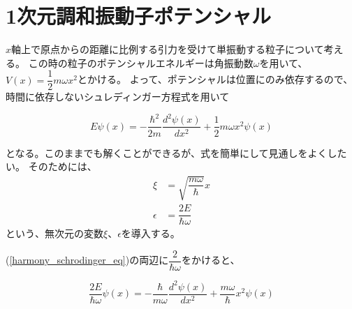 
\section{1次元調和振動子ポテンシャル}
$x$軸上で原点からの距離に比例する引力を受けて単振動する粒子について考える。
この時の粒子のポテンシャルエネルギーは角振動数$\omega$を用いて、$V(x) = \dfrac{1}{2}m\omega x^2$とかける。
よって、ポテンシャルは位置にのみ依存するので、時間に依存しないシュレディンガー方程式を用いて

\begin{equation}
  \label{harmony_schrodinger_eq}
  E\psi(x) = - \dfrac{\hbar^2}{2m} \dfrac{d^2 \psi(x)}{d x^2} + \dfrac{1}{2}m\omega x^2\psi(x)
\end{equation}

となる。このままでも解くことができるが、式を簡単にして見通しをよくしたい。
そのためには、
\begin{align}
  \label{xi}
  \xi &= \sqrt{\dfrac{m\omega}{\hbar}}x \\
  \label{eps}
  \epsilon &= \dfrac{2E}{\hbar\omega}
\end{align}
という、無次元の変数$\xi$、$\epsilon$を導入する。

(\ref{harmony_schrodinger_eq})の両辺に$\dfrac{2}{\hbar\omega}$をかけると、

\begin{equation}
  \dfrac{2E}{\hbar\omega}\psi(x) = - \dfrac{\hbar}{m\omega} \dfrac{d^2 \psi(x)}{d x^2} + \dfrac{m\omega}{\hbar} x^2\psi(x)
\end{equation}

